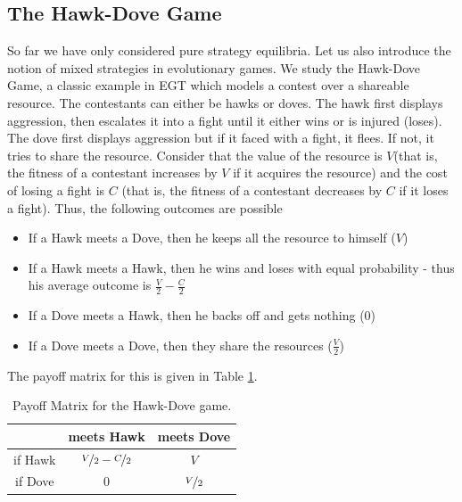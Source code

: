 \documentclass{article}
\theoremstyle{definition}
\begin{document}
\subsection{The Hawk-Dove Game}

So far we have only considered pure strategy equilibria. Let us also introduce the notion of mixed strategies in evolutionary games. We study the Hawk-Dove Game, a classic example in EGT which models a contest over a shareable resource. The contestants can either be hawks or doves. The hawk first displays aggression, then escalates it into a fight until it either wins or is injured (loses). The dove first displays aggression but if it faced with a fight, it flees. If not, it tries to share the resource. Consider that the value of the resource is $V$(that is, the fitness of a contestant increases by $V$ if it acquires the resource) and the cost of losing a fight is $C$ (that is, the fitness of a contestant decreases by $C$ if it loses a fight). Thus, the following outcomes are possible 

\begin{itemize}
    \item If a Hawk meets a Dove, then he keeps all the resource to himself ($V$)
    \item If a Hawk meets a Hawk, then he wins and loses with equal probability - thus his average outcome is $\frac{V}{2} - \frac{C}{2}$
    \item If a Dove meets a Hawk, then he backs off and gets nothing ($0$)
    \item If a Dove meets a Dove, then they share the resources ($\frac{V}{2}$)
\end{itemize}

The payoff matrix for this is given in Table \ref{table:hd}.

\begin{table}[H]
    \begin{adjustbox}{center}
    \begin{tabular}{|c|c|c|}
        \hline
         & meets Hawk & meets Dove \\
        \hline
        if Hawk & $\nicefrac{V}{2} - \nicefrac{C}{2}$ & $V$\\
        \hline 
        if Dove & $0$ & $\nicefrac{V}{2}$  \\
        \hline
    \end{tabular}
    \end{adjustbox}
    \caption{Payoff Matrix for the Hawk-Dove game.}
    \label{table:hd}
\end{table}
\end{document}
